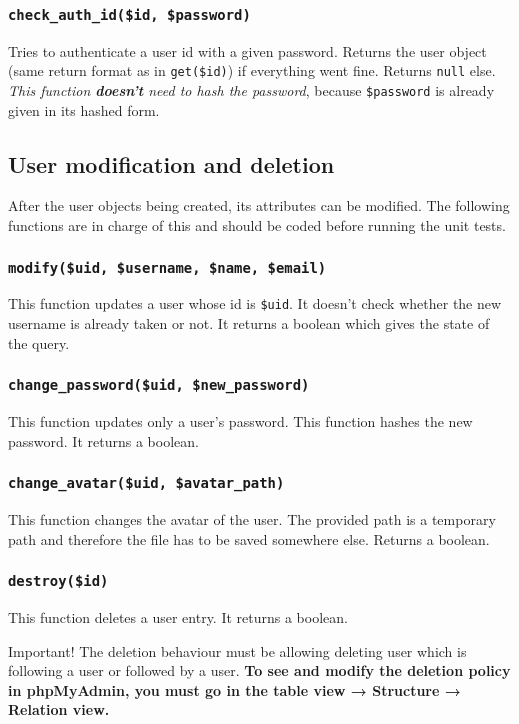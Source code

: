 \documentclass[twoside,a4paper,12pt]{article}
\begin{document}
\subsubsection{\texttt{check\_auth\_id(\$id, \$password)}}
Tries to authenticate a user id with a given password. Returns the user object (same return format as in \texttt{get(\$id)}) if everything went fine. Returns \texttt{null} else. \textit{This function \textbf{doesn't} need to hash the password}, because \texttt{\$password} is already given in its hashed form.

\subsection{User modification and deletion}
After the user objects being created, its attributes can be modified. The following functions are in charge of this and should be coded before running the unit tests.

\subsubsection{\texttt{modify(\$uid, \$username, \$name, \$email)}}
This function updates a user whose id is \texttt{\$uid}. It doesn't check whether the new username is already taken or not. It returns a boolean which gives the state of the query.


\subsubsection{\texttt{change\_password(\$uid, \$new\_password)}}
This function updates only a user's password. This function hashes the new password. It returns a boolean.

\subsubsection{\texttt{change\_avatar(\$uid, \$avatar\_path)}}
This function changes the avatar of the user. The provided path is a temporary path and therefore the file has to be saved somewhere else. Returns a boolean.

\subsubsection{\texttt{destroy(\$id)}}
This function deletes a user entry. It returns a boolean.

\begin{bclogo}[logo=\bcattention, noborder=true, barre=none]{Important!}
	The deletion behaviour must be allowing deleting user which is following a user or followed by a user. \textbf{To see and modify the deletion policy in phpMyAdmin, you must go in the table view → Structure → Relation view.}
		
\end{bclogo}
\end{document}
